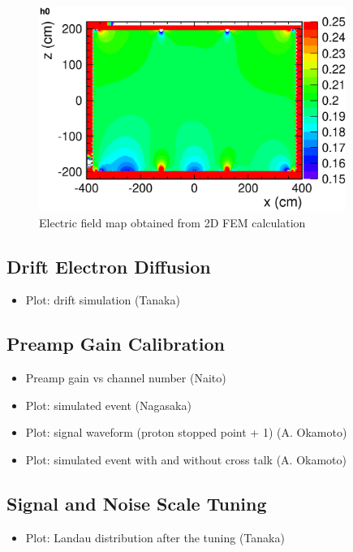 \begin{figure}[htbp]
 \begin{center}
  \includegraphics[width=100mm]{fig/2DFieldMap.eps}
 \end{center}
 \caption{Electric field map obtained from 2D FEM calculation}
 \label{Fig:2DFieldMap}
\end{figure}


\subsection{Drift Electron Diffusion}
\begin{itemize}
\item Plot: drift simulation  (Tanaka)
\end{itemize}

\subsection{Preamp Gain Calibration}
\begin{itemize}
\item Preamp gain vs channel number  (Naito)
\end{itemize}


\begin{itemize}
\item Plot: simulated event  (Nagasaka)
\end{itemize}


\begin{itemize}
\item Plot: signal waveform (proton stopped point + 1)  (A. Okamoto)
\item Plot: simulated event with and without cross talk (A. Okamoto)
\end{itemize}

\subsection{Signal and Noise Scale Tuning}
\begin{itemize}
\item Plot: Landau distribution after the tuning  (Tanaka)
\end{itemize}


